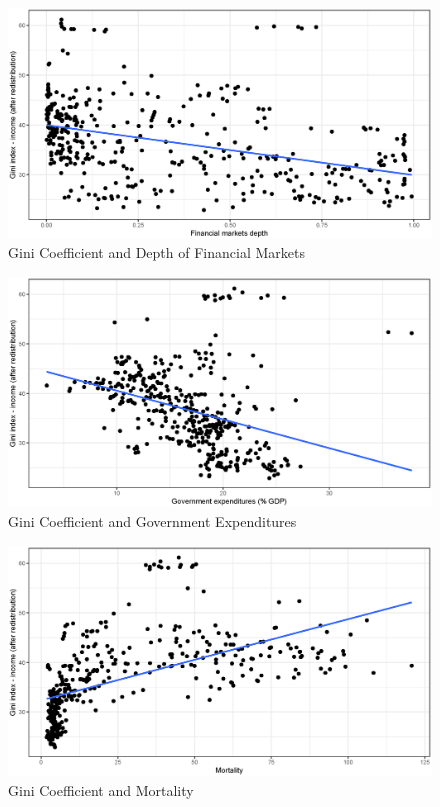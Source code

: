 \documentclass[a4paper,11pt]{article}
\begin{document}
\begin{figure}
    \caption{Gini Coefficient and Depth of Financial Markets}
    \label{fig:ginifmd}
\includegraphics[width=\textwidth, keepaspectratio]{figures/FMDGiniNet}
\end{figure}

\begin{figure}
    \caption{Gini Coefficient and Government Expenditures}
    \label{fig:ginigovexp}
\includegraphics[width=\textwidth, keepaspectratio]{figures/GovExpGiniNet}
\end{figure}

\begin{figure}
    \caption{Gini Coefficient and Mortality}
    \label{fig:ginimort}
\includegraphics[width=\textwidth, keepaspectratio]{figures/MortGiniNet}
\end{figure}
\end{document}
